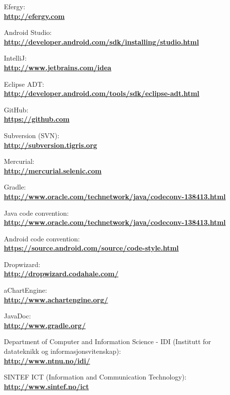 \begin{thebibliography}{1}
 Efergy:\\
\textbf{ \url{http://efergy.com}}

 Android Studio:\\
\textbf{ \url{http://developer.android.com/sdk/installing/studio.html}}

 IntelliJ:\\
\textbf{ \url{http://www.jetbrains.com/idea}}

 Eclipse ADT:\\
\textbf{ \url{http://developer.android.com/tools/sdk/eclipse-adt.html}}

 GitHub:\\
\textbf{ \url{https://github.com}}

 Subversion (SVN):\\
\textbf{ \url{http://subversion.tigris.org}}

 Mercurial:\\
\textbf{ \url{http://mercurial.selenic.com}}

 Gradle:\\
\textbf{ \url{http://www.oracle.com/technetwork/java/codeconv-138413.html}}

 Java code convention:\\
\textbf{ \url{http://www.oracle.com/technetwork/java/codeconv-138413.html}}

 Android code convention:\\
\textbf{ \url{https://source.android.com/source/code-style.html}}

 Dropwizard:\\
\textbf{ \url{http://dropwizard.codahale.com/}}

 aChartEngine:\\
\textbf{ \url{http://www.achartengine.org/}}

 JavaDoc:\\
\textbf{ \url{http://www.gradle.org/}}

 Department of Computer and Information Science - IDI (Institutt for datateknikk og informasjonsvitenskap):\\
\textbf{ \url{http://www.ntnu.no/idi/}}

 SINTEF ICT (Information and Communication Technology): \\
\textbf{ \url{http://www.sintef.no/ict}}


\end{thebibliography}
